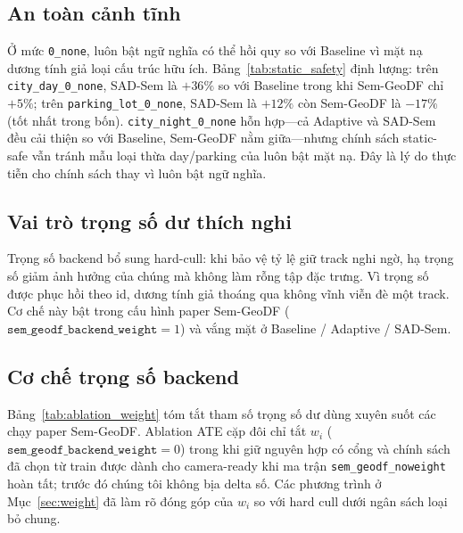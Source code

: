 \documentclass{ieeeaccess}
\begin{document}
\subsection{An toàn cảnh tĩnh}
\label{sec:staticsafe}
Ở mức \texttt{0\_none}, luôn bật ngữ nghĩa có thể hồi quy so với Baseline vì mặt nạ dương tính giả loại cấu trúc hữu ích.
Bảng~\ref{tab:static_safety} định lượng: trên \texttt{city\_day\_0\_none}, SAD-Sem là \(+36\%\) so với Baseline trong khi Sem-GeoDF chỉ \(+5\%\); trên \texttt{parking\_lot\_0\_none}, SAD-Sem là \(+12\%\) còn Sem-GeoDF là \(-17\%\) (tốt nhất trong bốn).
\texttt{city\_night\_0\_none} hỗn hợp---cả Adaptive và SAD-Sem đều cải thiện so với Baseline, Sem-GeoDF nằm giữa---nhưng chính sách static-safe vẫn tránh mẫu loại thừa day/parking của luôn bật mặt nạ.
Đây là lý do thực tiễn cho chính sách thay vì luôn bật ngữ nghĩa.



\subsection{Vai trò trọng số dư thích nghi}
Trọng số backend bổ sung hard-cull: khi bảo vệ tỷ lệ giữ track nghi ngờ, hạ trọng số giảm ảnh hưởng của chúng mà không làm rỗng tập đặc trưng.
Vì trọng số được phục hồi theo id, dương tính giả thoáng qua không vĩnh viễn đè một track.
Cơ chế này bật trong cấu hình paper Sem-GeoDF (\(\texttt{sem\_geodf\_backend\_weight}{=}1\)) và vắng mặt ở Baseline / Adaptive / SAD-Sem.

\subsection{Cơ chế trọng số backend}
\label{sec:ablation-weight}
Bảng~\ref{tab:ablation_weight} tóm tắt tham số trọng số dư dùng xuyên suốt các chạy paper Sem-GeoDF.
Ablation ATE cặp đôi chỉ tắt \(w_i\) (\(\texttt{sem\_geodf\_backend\_weight}{=}0\)) trong khi giữ nguyên hợp có cổng và chính sách đã chọn từ train được dành cho camera-ready khi ma trận \texttt{sem\_geodf\_noweight} hoàn tất; trước đó chúng tôi không bịa delta số.
Các phương trình ở Mục~\ref{sec:weight} đã làm rõ đóng góp của \(w_i\) so với hard cull dưới ngân sách loại bỏ chung.


\end{document}
